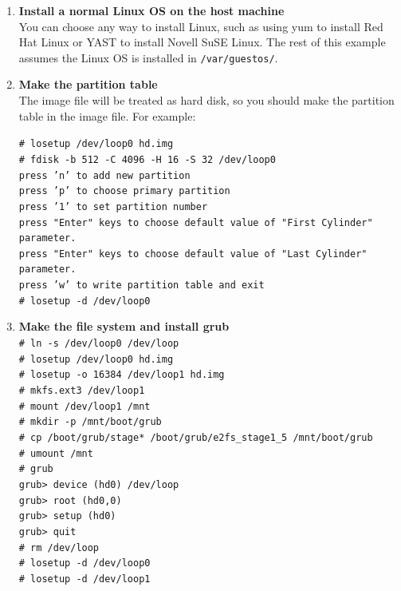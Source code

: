 \documentclass[11pt,twoside,final,openright]{report}
\begin{document}
\begin{enumerate}
\item {\bfseries Install a normal Linux OS on the host machine}\\
You can choose any way to install Linux, such as using yum to install Red Hat Linux or YAST to install Novell SuSE Linux. The rest of this example assumes the Linux OS is installed in {\small {\tt /var/guestos/}}.

\item {\bfseries Make the partition table}\\
The image file will be treated as hard disk, so you should make the partition table in the image file. For example:

{\scriptsize {\tt \# losetup /dev/loop0 hd.img\\
\# fdisk -b 512 -C 4096 -H 16 -S 32 /dev/loop0\\
press 'n' to add new partition\\
press 'p' to choose primary partition\\
press '1' to set partition number\\
press "Enter" keys to choose default value of "First Cylinder" parameter.\\
press "Enter" keys to choose default value of "Last Cylinder" parameter.\\
press 'w' to write partition table and exit\\
\# losetup -d /dev/loop0}}

\item {\bfseries Make the file system and install grub}\\
{\scriptsize {\tt \# ln -s /dev/loop0 /dev/loop\\
\# losetup /dev/loop0 hd.img\\
\# losetup -o 16384 /dev/loop1 hd.img\\
\# mkfs.ext3 /dev/loop1\\
\# mount /dev/loop1 /mnt\\
\# mkdir -p /mnt/boot/grub\\
\# cp /boot/grub/stage* /boot/grub/e2fs\_stage1\_5 /mnt/boot/grub\\
\# umount /mnt\\
\# grub\\
grub> device (hd0) /dev/loop\\
grub> root (hd0,0)\\
grub> setup (hd0)\\
grub> quit\\
\# rm /dev/loop\\
\# losetup -d /dev/loop0\\
\# losetup -d /dev/loop1}}


\end{enumerate}
\end{document}
